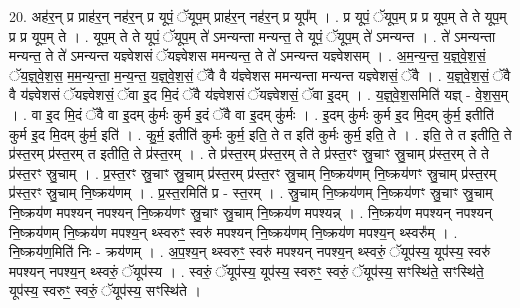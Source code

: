 \documentclass[17pt]{extarticle}
\begin{document}
20. अह॑र॒न् प्र प्राह॑र॒न् नह॑र॒न् प्र यूपं॒ ॅयूप॒म् प्राह॑र॒न् नह॑र॒न् प्र यूप᳚म् । . प्र यूपं॒ ॅयूप॒म् प्र प्र यूप॒म् ते ते यूप॒म् प्र प्र यूप॒म् ते । . यूप॒म् ते ते यूपं॒ ॅयूप॒म् ते॑ ऽमन्यन्ता मन्यन्त॒ ते यूपं॒ ॅयूप॒म् ते॑ ऽमन्यन्त । . ते॑ ऽमन्यन्ता मन्यन्त॒ ते ते॑ ऽमन्यन्त यज्ञ्वेशसं ॅयज्ञ्वेशस ममन्यन्त॒ ते ते॑ ऽमन्यन्त यज्ञ्वेशसम् । . अ॒म॒न्य॒न्त॒ य॒ज्ञ्॒वे॒श॒सं॒ ॅय॒ज्ञ्॒वे॒श॒स॒ म॒म॒न्य॒न्ता॒ म॒न्य॒न्त॒ य॒ज्ञ्॒वे॒श॒सं॒ ॅवै वै य॑ज्ञ्वेशस ममन्यन्ता मन्यन्त यज्ञ्वेशसं॒ ॅवै । . य॒ज्ञ्॒वे॒श॒सं॒ ॅवै वै य॑ज्ञ्वेशसं ॅयज्ञ्वेशसं॒ ॅवा इ॒द मि॒दं ॅवै य॑ज्ञ्वेशसं ॅयज्ञ्वेशसं॒ ॅवा इ॒दम् । . य॒ज्ञ्॒वे॒श॒समिति॑ यज्ञ् - वे॒श॒स॒म् । . वा इ॒द मि॒दं ॅवै वा इ॒दम् कु॑र्मः कुर्म इ॒दं ॅवै वा इ॒दम् कु॑र्मः । . इ॒दम् कु॑र्मः कुर्म इ॒द मि॒दम् कु॑र्म॒ इतीति॑ कुर्म इ॒द मि॒दम् कु॑र्म॒ इति॑ । . कु॒र्म॒ इतीति॑ कुर्मः कुर्म॒ इति॒ ते त इति॑ कुर्मः कुर्म॒ इति॒ ते । . इति॒ ते त इतीति॒ ते प्र॑स्त॒रम् प्र॑स्त॒रम् त इतीति॒ ते प्र॑स्त॒रम् । . ते प्र॑स्त॒रम् प्र॑स्त॒रम् ते ते प्र॑स्त॒रꣳ स्रु॒चाꣳ स्रु॒चाम् प्र॑स्त॒रम् ते ते प्र॑स्त॒रꣳ स्रु॒चाम् । . प्र॒स्त॒रꣳ स्रु॒चाꣳ स्रु॒चाम् प्र॑स्त॒रम् प्र॑स्त॒रꣳ स्रु॒चाम् नि॒ष्क्रय॑णम् नि॒ष्क्रय॑णꣳ स्रु॒चाम् प्र॑स्त॒रम् प्र॑स्त॒रꣳ स्रु॒चाम् नि॒ष्क्रय॑णम् । . प्र॒स्त॒रमिति॑ प्र - स्त॒रम् । . स्रु॒चाम् नि॒ष्क्रय॑णम् नि॒ष्क्रय॑णꣳ स्रु॒चाꣳ स्रु॒चाम् नि॒ष्क्रय॑ण मपश्यन् नपश्यन् नि॒ष्क्रय॑णꣳ स्रु॒चाꣳ स्रु॒चाम् नि॒ष्क्रय॑ण मपश्यन्न् । . नि॒ष्क्रय॑ण मपश्यन् नपश्यन् नि॒ष्क्रय॑णम् नि॒ष्क्रय॑ण मपश्य॒न् थ्स्वरुꣳ॒॒ स्वरु॑ मपश्यन् नि॒ष्क्रय॑णम् नि॒ष्क्रय॑ण मपश्य॒न् थ्स्वरु᳚म् । . नि॒ष्क्रय॑ण॒मिति॑ निः - क्रय॑णम् । . अ॒प॒श्य॒न् थ्स्वरुꣳ॒॒ स्वरु॑ मपश्यन् नपश्य॒न् थ्स्वरुं॒ ॅयूप॑स्य॒ यूप॑स्य॒ स्वरु॑ मपश्यन् नपश्य॒न् थ्स्वरुं॒ ॅयूप॑स्य । . स्वरुं॒ ॅयूप॑स्य॒ यूप॑स्य॒ स्वरुꣳ॒॒ स्वरुं॒ ॅयूप॑स्य॒ सꣳस्थि॑ते॒ सꣳस्थि॑ते॒ यूप॑स्य॒ स्वरुꣳ॒॒ स्वरुं॒ ॅयूप॑स्य॒ सꣳस्थि॑ते । \newline
\end{document}
